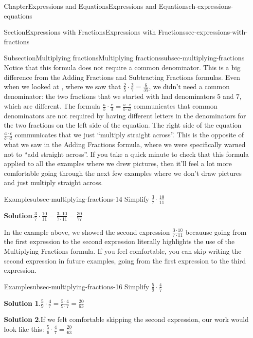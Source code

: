 \documentclass[twoside,11pt,]{book}
\newcommand{\blocktitlefont}{\relax}
\numberwithin{equation}{chapter}
\begin{document}
\begin{chapterptx}{Chapter}{Expressions and Equations}{}{Expressions and Equations}{}{}{ch-expressions-equations}
\begin{sectionptx}{Section}{Expressions with Fractions}{}{Expressions with Fractions}{}{}{sec-expressions-with-fractions}
\begin{subsectionptx}{Subsection}{Multiplying fractions}{}{Multiplying fractions}{}{}{subsec-multiplying-fractions}
Notice that this formula does not require a common denominator. This is a big difference from the Adding Fractions and Subtracting Fractions formulas. Even when we looked at , where we saw that \(\frac25 \cdot \frac37 = \frac{6}{35}\), we didn't need a common denominator: the two fractions that we started with had denominators \(5\) and \(7\), which are different. The formula \(\frac{a}{b} \cdot \frac{c}{d} = \frac{a \cdot c}{b \cdot d}\) communicates that common denominators are not required by having different letters in the denominators for the two fractions on the left side of the equation. The right side of the equation \(\frac{a \cdot c}{b \cdot d}\) communicates that we just ``multiply straight across''. This is the opposite of what we saw in the Adding Fractions formula, where we were specifically warned not to ``add straight across''. If you take a quick minute to check that this formula applied to all the examples where we drew pictures, then it'll feel a lot more comfortable going through the next few examples where we don't draw pictures and just multiply straight across.%
\begin{example}{Example}{}{subsec-multiplying-fractions-14}%
Simplify \(\frac{3}{7} \cdot \frac{10}{11}\)%
\par\smallskip%
\noindent\textbf{\blocktitlefont Solution}.\hypertarget{subsec-multiplying-fractions-14-2}{}\quad{}\(\frac{3}{7} \cdot \frac{10}{11} = \frac{3 \cdot 10}{7 \cdot 11} = \frac{30}{77}\)%
\end{example}
In the example above, we showed the second expression \(\frac{3 \cdot 10}{7 \cdot 11}\) becauuse going from the first expression to the second expression literally highlights the use of the Multiplying Fractions formula. If you feel comfortable, you can skip writing the second expression in future examples, going from the first expression to the third expression.%
\begin{example}{Example}{}{subsec-multiplying-fractions-16}%
Simplify \(\frac{5}{9} \cdot \frac{4}{7}\)%
\par\smallskip%
\noindent\textbf{\blocktitlefont Solution 1}.\hypertarget{subsec-multiplying-fractions-16-2}{}\quad{}\(\frac{5}{9} \cdot \frac{4}{7} = \frac{5 \cdot 4}{9 \cdot 7} = \frac{20}{63}\)%
\par\smallskip%
\noindent\textbf{\blocktitlefont Solution 2}.\hypertarget{subsec-multiplying-fractions-16-3}{}\quad{}If we felt comfortable skipping the second expression, our work would look like this: \(\frac{5}{9} \cdot \frac{4}{7} = \frac{20}{63}\)%
\end{example}

\end{subsectionptx}
\end{sectionptx}
\end{chapterptx}
\end{document}
